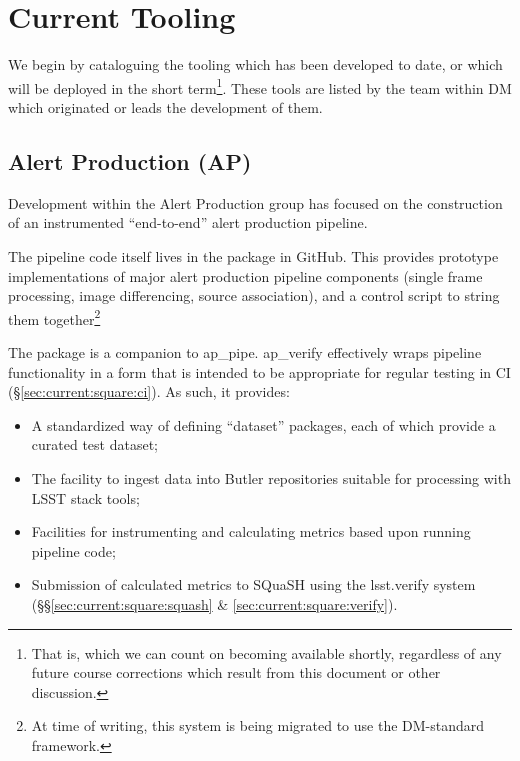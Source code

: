 \documentclass[DM,authoryear,toc,lsstdraft]{lsstdoc}
\begin{document}
\section{Current Tooling}
\label{sec:current}

We begin by cataloguing the tooling which has been developed to date, or which
will be deployed in the short term\footnote{That is, which we can count on
becoming available shortly, regardless of any future course corrections which
result from this document or other discussion.}. These tools are listed by the
team within DM which originated or leads the development of them.

\subsection{Alert Production (AP)}
\label{sec:current:ap}

Development within the Alert Production group has focused on the construction
of an instrumented ``end-to-end'' alert production pipeline.

The pipeline code itself lives in the  package in
GitHub. This provides prototype implementations of major alert production
pipeline components (single frame processing, image differencing, source
association), and a control script to string them together\footnote{At time of
writing, this system is being migrated to use the DM-standard
 framework.}

The  package is a companion to ap\_pipe. ap\_verify
effectively wraps pipeline functionality in a form that is intended to be
appropriate for regular testing in CI (\S\ref{sec:current:square:ci}). As
such, it provides:

\begin{itemize}

  \item{A standardized way of defining ``dataset'' packages, each of which
  provide a curated test dataset;}
  \item{The facility to ingest data into Butler repositories suitable for
  processing with LSST stack tools;}
  \item{Facilities for instrumenting and calculating metrics based upon
  running pipeline code;}
  \item{Submission of calculated metrics to SQuaSH using the lsst.verify
  system (\S\S\ref{sec:current:square:squash} \&
  \ref{sec:current:square:verify}).}

\end{itemize}
\end{document}
